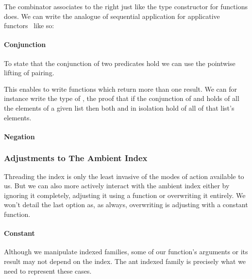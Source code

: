 The combinator  associates to the right just like the type
constructor for functions does. We can write the analogue of sequential
application for applicative functors~\cite{DBLP:journals/jfp/McbrideP08}
like so:

\paragraph{Conjunction} To state that the conjunction of two predicates hold
we can use the pointwise lifting of pairing.


This enables to write functions which return more than one result. We can
for instance write the type of , the proof that if the conjunction
of  and  holds of all the elements of a given list then both
 and  in isolation hold of all of that list's elements.

\paragraph{Negation}


\subsubsection{Adjustments to The Ambient Index}

Threading the index is only the least invasive of the modes of action
available to us. But we can also more actively interact with the ambient
index either by ignoring it completely, adjusting it using a function
or overwriting it entirely. We won't detail the last option as, as always,
overwriting is adjusting with a constant function.

\paragraph{Constant} Although we manipulate indexed families, some of
our function's arguments or its result may not depend on the index.
The ant indexed family is precisely what we need to represent
these cases.


